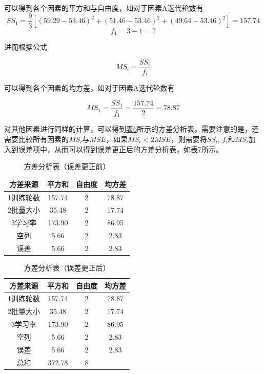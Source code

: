 \documentclass[UTF8]{ctexart}
\begin{document}
	可以得到各个因素的平方和与自由度，如对于因素A迭代轮数有
	\begin{equation*}
	SS_1 = \frac{9}{3}[(59.29-53.46)^2 + (51.46-53.46)^2 + (49.64-53.46)^2] = 157.74
	\end{equation*}
	\begin{equation*}
	f_1 = 3 - 1 = 2
	\end{equation*}
	
	进而根据公式
	
	\begin{equation*}
	MS_i = \frac{SS_i}{f_i}
	\end{equation*}
	
	可以得到各个因素的均方差，如对于因素A迭代轮数有
	
	\begin{equation*}
	MS_1 = \frac{SS_1}{f_1} = \frac{157.74}{2} = 78.87
	\end{equation*}
	
	对其他因素进行同样的计算，可以得到\hyperref[Chart.6]{表6}所示的方差分析表。需要注意的是，还需要比较所有因素的$MS_i$与$MSE$，如果$MS_i < 2MSE$，则需要将$SS_i$, $f_i$和$MS_i$加入到误差项中，从而可以得到误差更正后的方差分析表，如\hyperref[Chart.7]{表7}所示。
	
	\begin{table}[htbp]
		\centering
		\caption{方差分析表（误差更正前）}
		\begin{tabular}{|c|c|c|c|}
			\hline
			方差来源 & 平方和 & 自由度 & 均方差 \\\hline
			1训练轮数 & 157.74 & 2 & 78.87 \\\hline
			2批量大小 & 35.48 & 2 & 17.74 \\\hline
			3学习率 & 173.90 & 2 & 86.95 \\\hline
			空列 & 5.66 & 2 & 2.83 \\\hline
			误差 & 5.66 & 2 & 2.83 \\\hline
		\end{tabular}%
		\label{Chart.6}%
	\end{table}%
	
	\begin{table}[htbp]
		\centering
		\caption{方差分析表（误差更正后）}
		\begin{tabular}{|c|c|c|c|}
			\hline
			方差来源 & 平方和 & 自由度 & 均方差 \\\hline
			1训练轮数 & 157.74 & 2 & 78.87 \\\hline
			2批量大小 & 35.48 & 2 & 17.74 \\\hline
			3学习率 & 173.90 & 2 & 86.95 \\\hline
			空列 & 5.66 & 2 & 2.83 \\\hline
			误差 & 5.66 & 2 & 2.83 \\\hline
			总和 & 372.78 & 8 & \\\hline
		\end{tabular}%
		\label{Chart.7}%
	\end{table}%
	
\end{document}
